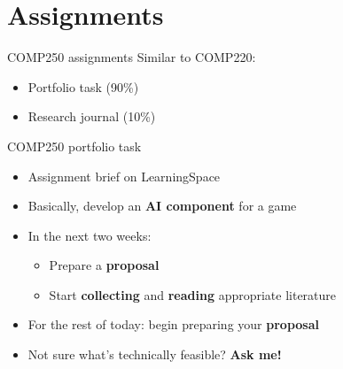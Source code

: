 \part{Assignments}
\frame{\partpage}

\begin{frame}{COMP250 assignments}
	\pause Similar to COMP220:
	\begin{itemize}
		\pause\item Portfolio task (90\%)
		\pause\item Research journal (10\%)
	\end{itemize}
\end{frame}

\begin{frame}{COMP250 portfolio task}
	\begin{itemize}
		\pause\item Assignment brief on LearningSpace
		\pause\item Basically, develop an \textbf{AI component} for a game
		\pause\item In the next two weeks:
			\begin{itemize}
				\pause\item Prepare a \textbf{proposal}
				\pause\item Start \textbf{collecting} and \textbf{reading} appropriate literature
			\end{itemize}
		\pause\item For the rest of today: begin preparing your \textbf{proposal}
		\pause\item Not sure what's technically feasible? \textbf{Ask me!}
	\end{itemize}
\end{frame}

